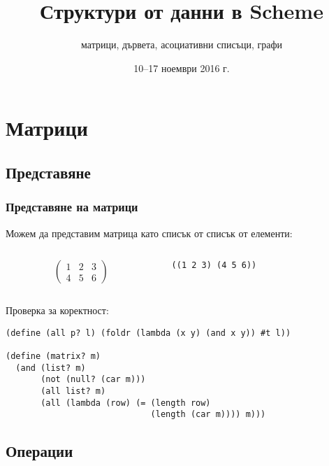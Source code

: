 \documentclass{beamer}
\title{Структури от данни в Scheme}
\subtitle{матрици, дървета, асоциативни списъци, графи}
\date{10--17 ноември 2016 г.}
\begin{document}
\begin{frame}
  \titlepage
\end{frame}

\section{Матрици}

\subsection{Представяне}

\begin{frame}[fragile]
  \frametitle{Представяне на матрици}
  Можем да представим матрица като списък от списък от елементи:

  \begin{columns}[t,onlytextwidth]
    \begin{column}{0.5\textwidth}
      \begin{equation*}
        \left(
          \begin{array}{ccc}
            1 & 2 & 3\\
            4 & 5 & 6
          \end{array}
        \right)
      \end{equation*}
    \end{column}
    \begin{column}{0.5\textwidth}

      \tt{((1 2 3) (4 5 6))}
    \end{column}
  \end{columns}
  \vspace{1em}
  \pause
  Проверка за коректност:
  \pause
\begin{lstlisting}
(define (all p? l) (foldr (lambda (x y) (and x y)) #t l))

(define (matrix? m)
  (and (list? m)
       (not (null? (car m)))
       (all list? m)
       (all (lambda (row) (= (length row)
                             (length (car m)))) m)))
\end{lstlisting}
\end{frame}

\subsection{Операции}
\end{document}
